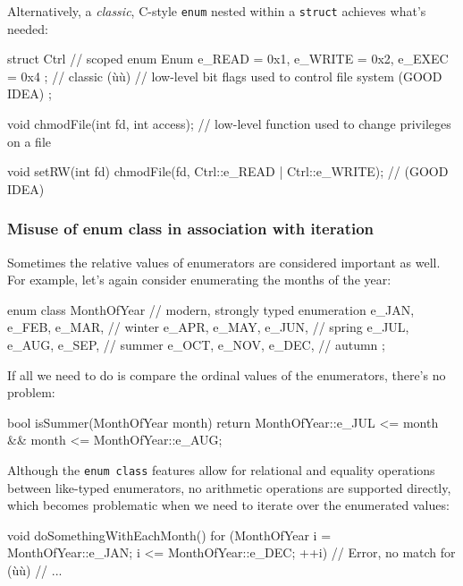 \noindent Alternatively, a \emph{classic}, C-style \texttt{enum} nested within a
\texttt{struct} achieves what's needed:

\begin{emcppslisting}
struct Ctrl // scoped
{
    enum Enum { e_READ = 0x1, e_WRITE = 0x2, e_EXEC = 0x4 };  // classic (ù{}ù)
        // low-level bit flags used to control file system (GOOD IDEA)
};

void chmodFile(int fd, int access);
    // low-level function used to change privileges on a file

void setRW(int fd)
{
    chmodFile(fd, Ctrl::e_READ | Ctrl::e_WRITE);  // (GOOD IDEA)
}
\end{emcppslisting}


\subsubsection[Misuse of {\tt enum} {\tt class} in association with iteration]{Misuse of {\SubsubsecCode enum} {\SubsubsecCode class} in association with iteration}\label{misuse-of-enum-class-in-association-with-iteration}

Sometimes the relative values of enumerators are considered important as
well. For example, let's again consider enumerating the months of the
year:

\begin{emcppslisting}
enum class MonthOfYear  // modern, strongly typed enumeration
{
    e_JAN, e_FEB, e_MAR,  // winter
    e_APR, e_MAY, e_JUN,  // spring
    e_JUL, e_AUG, e_SEP,  // summer
    e_OCT, e_NOV, e_DEC,  // autumn
};
\end{emcppslisting}

\noindent If all we need to do is compare the ordinal values of the enumerators,
there's no problem:

\begin{emcppslisting}
bool isSummer(MonthOfYear month)
{
    return MonthOfYear::e_JUL <= month && month <= MonthOfYear::e_AUG;
}
\end{emcppslisting}

\noindent Although the \texttt{enum}~\texttt{class} features allow for relational
and equality operations between like-typed enumerators, no arithmetic
operations are supported directly, which becomes problematic when we
need to iterate over the enumerated values:

\begin{emcppslisting}
void doSomethingWithEachMonth()
{
    for (MonthOfYear i =  MonthOfYear::e_JAN;
                     i <= MonthOfYear::e_DEC;
                   ++i)  // Error, no match for (ù{\codeincomments{++}}ù)
    {
        // ...
    }
}
\end{emcppslisting}

